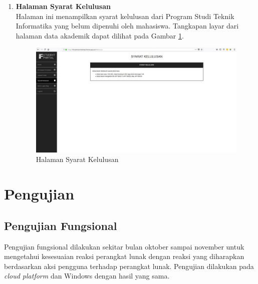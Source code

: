 \begin{enumerate}
				\item\textbf{Halaman Syarat Kelulusan}\\
				Halaman ini menampilkan syarat kelulusan dari Program Studi Teknik Informatika yang belum dipenuhi oleh mahasiswa. Tangkapan layar dari halaman data akademik dapat dilihat pada Gambar \ref{fig:5_halaman_syarat_kelulusan}.
				\begin{figure}[H]
						\centering
						\includegraphics[scale=0.34]{Gambar/halaman_syarat_kelulusan}
						\caption{Halaman Syarat Kelulusan} 
						\label{fig:5_halaman_syarat_kelulusan}
					\end{figure}
		\end{enumerate}
		
\section{Pengujian}

\subsection{Pengujian Fungsional}
\label{subsec:fungsional}

Pengujian fungsional dilakukan sekitar bulan oktober sampai november untuk mengetahui kesesuaian reaksi perangkat lunak dengan reaksi yang diharapkan berdasarkan aksi pengguna terhadap perangkat lunak. Pengujian dilakukan pada \textit{cloud platform} dan Windows dengan hasil yang sama.

